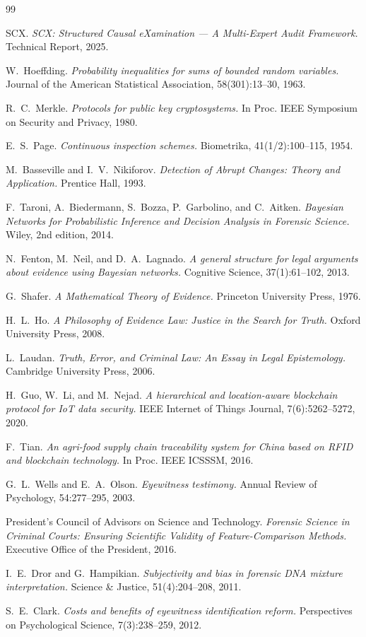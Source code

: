 \documentclass[11pt,a4paper]{article}
\theoremstyle{definition}
\begin{document}
\begin{thebibliography}{99}

SCX.
\emph{SCX: Structured Causal eXamination --- A Multi-Expert Audit Framework.}
Technical Report, 2025.

W.~Hoeffding.
\emph{Probability inequalities for sums of bounded random variables.}
Journal of the American Statistical Association, 58(301):13--30, 1963.

R.~C.~Merkle.
\emph{Protocols for public key cryptosystems.}
In Proc. IEEE Symposium on Security and Privacy, 1980.

E.~S.~Page.
\emph{Continuous inspection schemes.}
Biometrika, 41(1/2):100--115, 1954.

M.~Basseville and I.~V.~Nikiforov.
\emph{Detection of Abrupt Changes: Theory and Application.}
Prentice Hall, 1993.

F.~Taroni, A.~Biedermann, S.~Bozza, P.~Garbolino, and C.~Aitken.
\emph{Bayesian Networks for Probabilistic Inference and Decision Analysis in Forensic Science.}
Wiley, 2nd edition, 2014.

N.~Fenton, M.~Neil, and D.~A.~Lagnado.
\emph{A general structure for legal arguments about evidence using Bayesian networks.}
Cognitive Science, 37(1):61--102, 2013.

G.~Shafer.
\emph{A Mathematical Theory of Evidence.}
Princeton University Press, 1976.

H.~L.~Ho.
\emph{A Philosophy of Evidence Law: Justice in the Search for Truth.}
Oxford University Press, 2008.

L.~Laudan.
\emph{Truth, Error, and Criminal Law: An Essay in Legal Epistemology.}
Cambridge University Press, 2006.

H.~Guo, W.~Li, and M.~Nejad.
\emph{A hierarchical and location-aware blockchain protocol for IoT data security.}
IEEE Internet of Things Journal, 7(6):5262--5272, 2020.

F.~Tian.
\emph{An agri-food supply chain traceability system for China based on RFID and blockchain technology.}
In Proc. IEEE ICSSSM, 2016.

G.~L.~Wells and E.~A.~Olson.
\emph{Eyewitness testimony.}
Annual Review of Psychology, 54:277--295, 2003.

President's Council of Advisors on Science and Technology.
\emph{Forensic Science in Criminal Courts: Ensuring Scientific Validity of Feature-Comparison Methods.}
Executive Office of the President, 2016.

I.~E.~Dror and G.~Hampikian.
\emph{Subjectivity and bias in forensic DNA mixture interpretation.}
Science \& Justice, 51(4):204--208, 2011.

S.~E.~Clark.
\emph{Costs and benefits of eyewitness identification reform.}
Perspectives on Psychological Science, 7(3):238--259, 2012.

\end{thebibliography}
\end{document}
